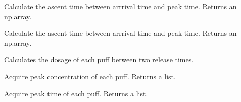 \documentclass[letterpaper,10pt,english]{sphinxmanual}
\begin{document}
\begin{fulllineitems}
\begin{fulllineitems}
\label{\detokenize{index:windtunnel.PuffConcentration.get_ascent_time}}
Calculate the ascent time between arrrival time and peak time. 
Returns an np.array.

\end{fulllineitems}


\begin{fulllineitems}
\label{\detokenize{index:windtunnel.PuffConcentration.get_descent_time}}
Calculate the ascent time between arrrival time and peak time. 
Returns an np.array.

\end{fulllineitems}


\begin{fulllineitems}
\label{\detokenize{index:windtunnel.PuffConcentration.get_dosage}}
Calculates the dosage of each puff between two release times.

\end{fulllineitems}


\begin{fulllineitems}
\label{\detokenize{index:windtunnel.PuffConcentration.get_peak_concentration}}
Acquire peak concentration of each puff. Returns a list.

\end{fulllineitems}


\begin{fulllineitems}
\label{\detokenize{index:windtunnel.PuffConcentration.get_peak_time}}
Acquire peak time of each puff. Returns a list.

\end{fulllineitems}



\end{fulllineitems}
\end{document}
